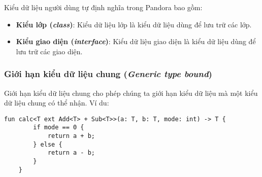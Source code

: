Kiểu dữ liệu người dùng tự định nghĩa trong Pandora bao gồm:

\begin{itemize}
    \item \textbf{Kiểu lớp (\textit{class})}: Kiểu dữ liệu lớp là kiểu dữ liệu dùng để lưu trữ các lớp.

    \item \textbf{Kiểu giao diện (\textit{interface})}: Kiểu dữ liệu giao diện là kiểu dữ liệu dùng để lưu trữ các giao diện.
\end{itemize}

\subsubsection{Giới hạn kiểu dữ liệu chung (\textit{Generic type bound})}

\regextypebound

Giới hạn kiểu dữ liệu chung cho phép chúng ta giới hạn kiểu dữ liệu mà một kiểu dữ liệu chung có thể nhận. Ví du:

\begin{lstlisting}[]
    fun calc<T ext Add<T> + Sub<T>>(a: T, b: T, mode: int) -> T {
        if mode == 0 {
            return a + b;
        } else {
            return a - b;
        }
    }
\end{lstlisting}
